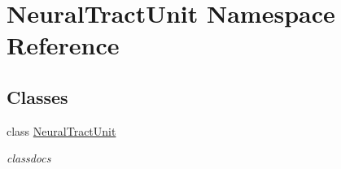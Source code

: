\hypertarget{namespace_neural_tract_unit}{}\section{Neural\+Tract\+Unit Namespace Reference}
\label{namespace_neural_tract_unit}
\subsection*{Classes}
\begin{DoxyCompactItemize}
\item 
class \hyperlink{class_neural_tract_unit_1_1_neural_tract_unit}{Neural\+Tract\+Unit}
\begin{DoxyCompactList}\small\item\em classdocs \end{DoxyCompactList}\end{DoxyCompactItemize}
